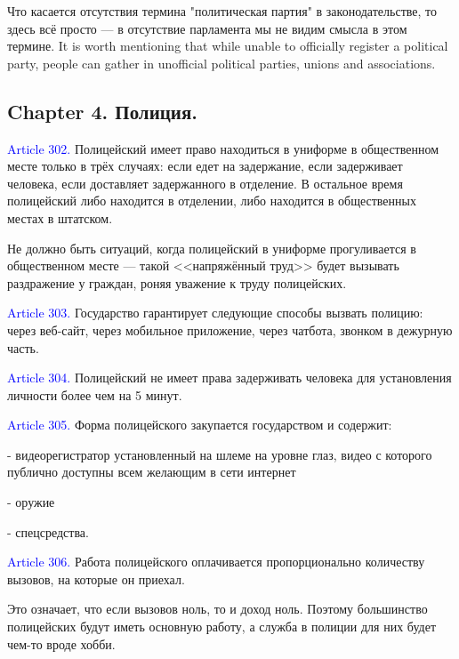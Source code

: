 \documentclass[11pt]{article}
\theoremstyle{remark}
\theoremstyle{definition}
\begin{document}
\color{blue}



Что касается отсутствия термина "политическая партия" в законодательстве, то здесь всё просто --- в отсутствие парламента мы не видим смысла в этом термине. It is worth mentioning that while unable to officially register a political party, people can gather in unofficial political parties, unions and associations. 



\color{black}




\subsection*{Chapter 4. Полиция.}




\textcolor{blue}{Article 302.} Полицейский имеет право находиться в униформе в общественном месте только в трёх случаях: если едет на задержание, если задерживает человека, если доставляет задержанного в отделение. В остальное время полицейский либо находится в отделении, либо находится в общественных местах в штатском.

\color{blue}

Не должно быть ситуаций, когда полицейский в униформе прогуливается в общественном месте --- такой <<напряжённый труд>> будет вызывать раздражение у граждан, роняя уважение к труду полицейских. 

\color{black}

\textcolor{blue}{Article 303.} Государство гарантирует следующие способы вызвать полицию: через веб-сайт, через мобильное приложение, через чатбота, звонком в дежурную часть.

\textcolor{blue}{Article 304.} Полицейский не имеет права задерживать человека для установления личности более чем на 5 минут.

\textcolor{blue}{Article 305.} Форма полицейского закупается государством и содержит:

- видеорегистратор установленный на шлеме на уровне глаз, видео с которого публично доступны всем желающим в сети интернет

- оружие

- спецсредства.


\textcolor{blue}{Article 306.} Работа полицейского оплачивается пропорционально количеству вызовов, на которые он приехал. 

\color{blue}

Это означает, что если вызовов ноль, то и доход ноль. Поэтому большинство полицейских будут иметь основную работу, а служба в полиции для них будет чем-то вроде хобби.
\end{document}
